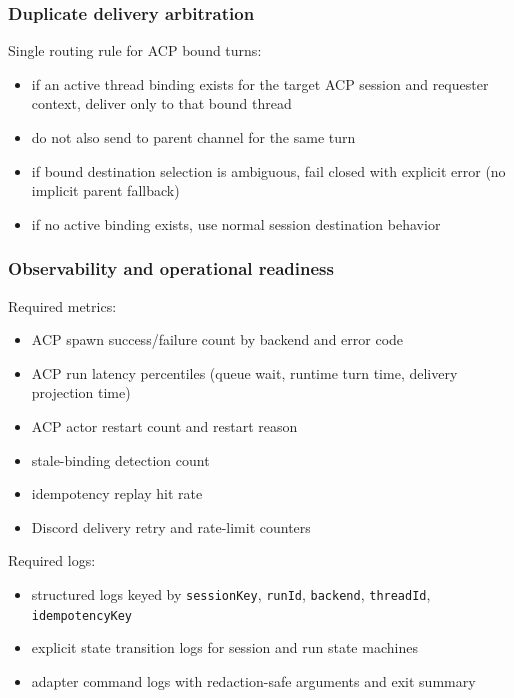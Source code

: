 \subsubsection{Duplicate delivery arbitration}


Single routing rule for ACP bound turns:

\begin{itemize}
  \item if an active thread binding exists for the target ACP session and requester context, deliver only to that bound thread
  \item do not also send to parent channel for the same turn
  \item if bound destination selection is ambiguous, fail closed with explicit error (no implicit parent fallback)
  \item if no active binding exists, use normal session destination behavior
\end{itemize}


\subsubsection{Observability and operational readiness}


Required metrics:

\begin{itemize}
  \item ACP spawn success/failure count by backend and error code
  \item ACP run latency percentiles (queue wait, runtime turn time, delivery projection time)
  \item ACP actor restart count and restart reason
  \item stale-binding detection count
  \item idempotency replay hit rate
  \item Discord delivery retry and rate-limit counters
\end{itemize}


Required logs:

\begin{itemize}
  \item structured logs keyed by \texttt{sessionKey}, \texttt{runId}, \texttt{backend}, \texttt{threadId}, \texttt{idempotencyKey}
  \item explicit state transition logs for session and run state machines
  \item adapter command logs with redaction-safe arguments and exit summary
\end{itemize}


